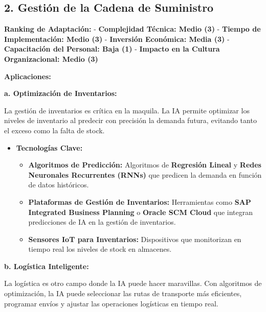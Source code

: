 \documentclass[
  10pt,
  letterpaper,
]{book}
\providecommand{\tightlist}{%
  \setlength{\itemsep}{0pt}\setlength{\parskip}{0pt}}\usepackage{longtable,booktabs,array}
\begin{document}
\subsection{\texorpdfstring{2. \textbf{Gestión de la Cadena de
Suministro}}{2. Gestión de la Cadena de Suministro}}\label{gestiuxf3n-de-la-cadena-de-suministro}

\textbf{Ranking de Adaptación:} - \textbf{Complejidad Técnica: Medio
(3)} - \textbf{Tiempo de Implementación: Medio (3)} - \textbf{Inversión
Económica: Media (3)} - \textbf{Capacitación del Personal: Baja (1)} -
\textbf{Impacto en la Cultura Organizacional: Medio (3)}

\textbf{Aplicaciones:}

\textbf{a. Optimización de Inventarios:}

La gestión de inventarios es crítica en la maquila. La IA permite
optimizar los niveles de inventario al predecir con precisión la demanda
futura, evitando tanto el exceso como la falta de stock.

\begin{itemize}
\tightlist
\item
  \textbf{Tecnologías Clave:}

  \begin{itemize}
  \tightlist
  \item
    \textbf{Algoritmos de Predicción:} Algoritmos de \textbf{Regresión
    Lineal} y \textbf{Redes Neuronales Recurrentes (RNNs)} que predicen
    la demanda en función de datos históricos.
  \item
    \textbf{Plataformas de Gestión de Inventarios:} Herramientas como
    \textbf{SAP Integrated Business Planning} o \textbf{Oracle SCM
    Cloud} que integran predicciones de IA en la gestión de inventarios.
  \item
    \textbf{Sensores IoT para Inventarios:} Dispositivos que monitorizan
    en tiempo real los niveles de stock en almacenes.
  \end{itemize}
\end{itemize}

\textbf{b. Logística Inteligente:}

La logística es otro campo donde la IA puede hacer maravillas. Con
algoritmos de optimización, la IA puede seleccionar las rutas de
transporte más eficientes, programar envíos y ajustar las operaciones
logísticas en tiempo real.
\end{document}
